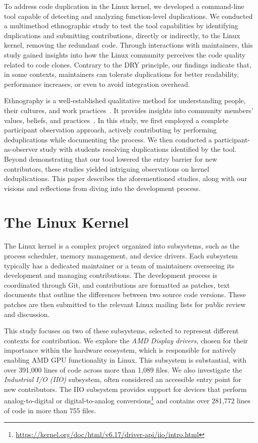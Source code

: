 \documentclass[10pt,conference]{IEEEtran}
\begin{document}
To address code duplication in the Linux kernel, we developed a command-line tool capable of detecting and analyzing function-level duplications. We conducted a multimethod ethnographic study to test the tool capabilities by identifying duplications and submitting contributions, directly or indirectly, to the Linux kernel, removing the redundant code. Through interactions with maintainers, this study gained insights into how the Linux community perceives the code quality related to code clones. Contrary to the DRY principle, our findings indicate that, in some contexts, maintainers can tolerate duplications for better readability, performance increases, or even to avoid integration overhead.

Ethnography is a well-established qualitative method for understanding people, their cultures, and work practices~\cite{bookethno}. It provides insights into community members’ values, beliefs, and practices~\cite{ethnosoft}. In this study, we first employed a complete participant observation approach, actively contributing by performing deduplications while documenting the process. We then conducted a participant-as-observer study with students resolving duplications identified by the tool. Beyond demonstrating that our tool lowered the entry barrier for new contributors, these studies yielded intriguing observations on kernel deduplications. This paper describes the aforementioned studies, along with our visions and reflections from diving into the development process.

\section{The Linux Kernel}

The Linux kernel is a complex project organized into subsystems, such as the process scheduler, memory management, and device drivers. Each subsystem typically has a dedicated maintainer or a team of maintainers overseeing its development and managing contributions. The development process is coordinated through Git, and contributions are formatted as patches, text documents that outline the differences between two source code versions. These patches are then submitted to the relevant Linux mailing lists for public review and discussion.

This study focuses on two of these subsystems, selected to represent different contexts for contribution. We explore the \textit{AMD Display drivers}, chosen for their importance within the hardware ecosystem, which is responsible for natively enabling AMD GPU functionality in Linux. This subsystem is substantial, with over 391,000 lines of code across more than 1,089 files. We also investigate the \textit{Industrial I/O (IIO)} subsystem, often considered an accessible entry point for new contributors. The IIO subsystem provides support for devices that perform analog-to-digital or digital-to-analog conversions\footnote{\href{https://kernel.org/doc/html/v6.17/driver-api/iio/intro.html}{https://kernel.org/doc/html/v6.17/driver-api/iio/intro.html}} and contains over 281,772 lines of code in more than 755 files.
\end{document}
